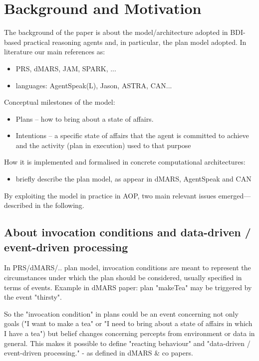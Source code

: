 \section{Background and Motivation}


The background of the paper is about the  model/architecture adopted in BDI-based practical reasoning agents and, in particular, the plan model adopted.
%
In literature our main references as:
%
\begin{itemize}
\item PRS, dMARS, JAM, SPARK, ...
\item languages: AgentSpeak(L), Jason, ASTRA, CAN...
\end{itemize}
%

%
%
Conceptual milestones of the model:
\begin{itemize}
\item Plans --  how to bring about a state of affairs. 
\item Intentions --  a specific state of affairs that the agent is committed to achieve and the activity (plan in execution) used to that purpose
\end{itemize}

%
%
How it is implemented and formalised in concrete computational architectures:
\begin{itemize}
\item briefly describe the plan model, as appear in dMARS, AgentSpeak and CAN
\end{itemize}

%
%
By exploiting the model in practice in AOP, two main relevant issues emerged---described in the following.

\subsection{About invocation conditions and data-driven / event-driven processing}

In PRS/dMARS/.. plan model, invocation conditions are meant to represent the circumstances under which the plan should be considered, usually specified in terms of events.
%
Example in dMARS paper: plan "makeTea" may be triggered by the event "thirsty".

So the "invocation condition" in plans could be an event concerning not only goals ("I want to make a tea" or "I need to bring about a state of affairs in which I have a tea") but belief changes concerning percepts from environment or data in general.
%
This makes it possible to define "reacting behaviour" and "data-driven / event-driven processing." - as defined in dMARS \& co papers.

